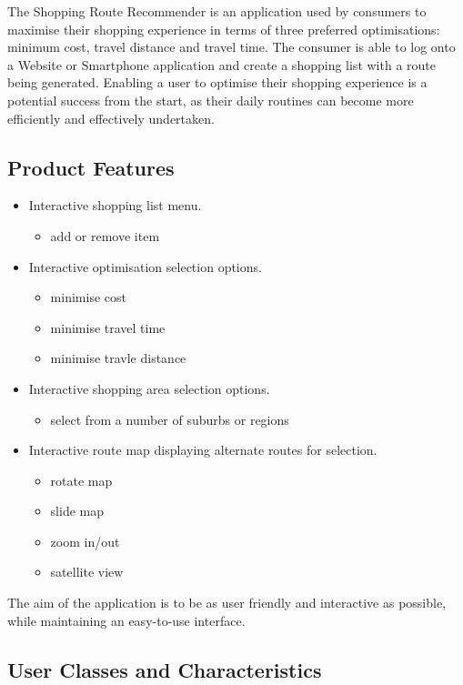 \documentclass[10pt, a4paper, onecolumn]{scrartcl}
\begin{document}
			The Shopping Route Recommender is an application used by consumers to maximise their shopping experience in terms of three preferred optimisations: minimum cost, travel distance and travel time. The consumer is able to log onto a Website or Smartphone application and create a shopping list with a route being generated.  Enabling a user to optimise their shopping experience is a potential success from the start, as their daily routines can become more efficiently and effectively undertaken. 
		
		\subsection{Product Features}
		
			\begin{itemize}
				\item Interactive shopping list menu.
				\begin{itemize}
					\item add or remove item
				\end{itemize}
				\item Interactive optimisation selection options.
				\begin{itemize}
					\item minimise cost
					\item minimise travel time
					\item minimise travle distance
				\end{itemize}
				\item Interactive shopping area selection options.
				\begin{itemize}
					\item select from a number of suburbs or regions
				\end{itemize}
				\item Interactive route map displaying alternate routes for selection.
				\begin{itemize}
					\item rotate map
					\item slide map
					\item zoom in/out
					\item satellite view
				\end{itemize}
			\end{itemize}
			
			The aim of the application is to be as user friendly and interactive as possible, while maintaining an easy-to-use interface. 
		
		\subsection{User Classes and Characteristics}
		
\end{document}
